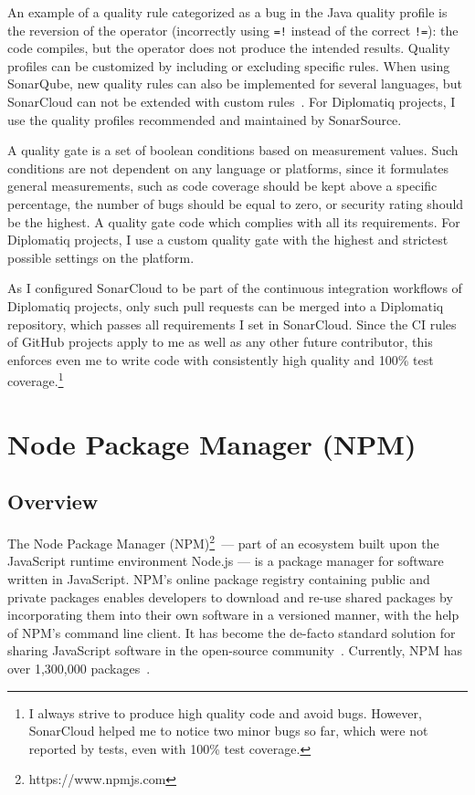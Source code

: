 An example of a quality rule categorized as a bug in the Java quality profile is the reversion of the  operator (incorrectly using \lstinline{=!} instead of the correct \lstinline{!=}): the code compiles, but the operator does not produce the intended results. Quality profiles can be customized by including or excluding specific rules. When using SonarQube, new quality rules can also be implemented for several languages, but SonarCloud can not be extended with custom rules~\cite{sonar-custom-rules}. For Diplomatiq projects, I use the quality profiles recommended and maintained by SonarSource.

A quality gate is a set of boolean conditions based on measurement values. Such conditions are not dependent on any language or platforms, since it formulates general measurements, such as code coverage should be kept above a specific percentage, the number of bugs should be equal to zero, or security rating should be the highest. A quality gate  code which complies with all its requirements. For Diplomatiq projects, I use a custom quality gate with the highest and strictest possible settings on the platform.

As I configured SonarCloud to be part of the continuous integration workflows of Diplomatiq projects, only such pull requests can be merged into a Diplomatiq repository, which passes all requirements I set in SonarCloud. Since the CI rules of GitHub projects apply to me as well as any other future contributor, this enforces even me to write code with consistently high quality and 100\% test coverage.\footnote{I always strive to produce high quality code and avoid bugs. However, SonarCloud helped me to notice two minor bugs so far, which were not reported by tests, even with 100\% test coverage.}

\section{Node Package Manager (NPM)}

\subsection{Overview}

The Node Package Manager (NPM)\footnote{https://www.npmjs.com} — part of an ecosystem built upon the JavaScript runtime environment Node.js — is a package manager for software written in JavaScript. NPM's online package registry containing public and private packages enables developers to download and re-use shared packages by incorporating them into their own software in a versioned manner, with the help of NPM's command line client. It has become the de-facto standard solution for sharing JavaScript software in the open-source community~\cite{herron2016node}. Currently, NPM has over 1,300,000 packages~\cite{npm-website}.

